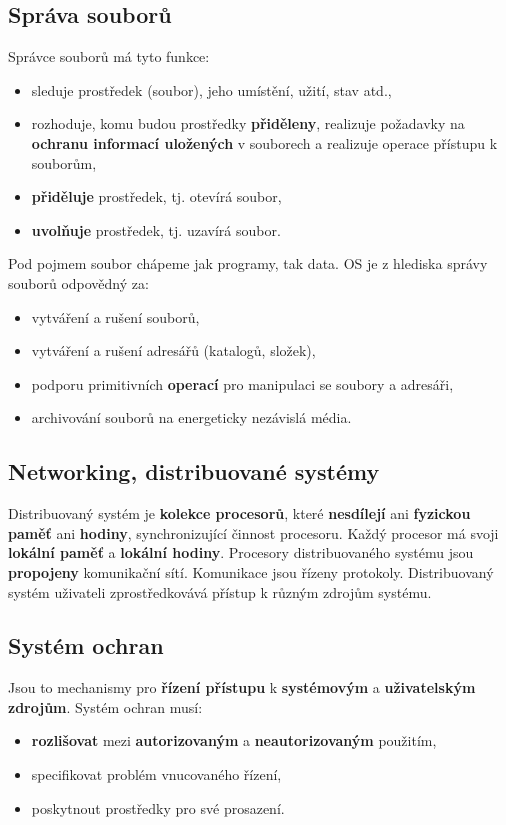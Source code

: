 \subsection{Správa souborů}
Správce souborů má tyto funkce:
\begin{itemize}
    \item sleduje prostředek (soubor), jeho umístění, užití, stav atd.,
    \item rozhoduje, komu budou prostředky \textbf{přiděleny}, realizuje požadavky na \textbf{ochranu informací uložených} v souborech a realizuje operace přístupu k souborům,
    \item \textbf{přiděluje} prostředek, tj. otevírá soubor,
    \item \textbf{uvolňuje} prostředek, tj. uzavírá soubor.
\end{itemize}
Pod pojmem soubor chápeme jak programy, tak data. OS je z hlediska správy souborů odpovědný za:
\begin{itemize}
    \item vytváření a rušení souborů,
    \item vytváření a rušení adresářů (katalogů, složek),
    \item podporu primitivních \textbf{operací} pro manipulaci se soubory a adresáři,
    \item archivování souborů na energeticky nezávislá média.
\end{itemize}
\subsection{Networking, distribuované systémy}
Distribuovaný systém je \textbf{kolekce procesorů}, které \textbf{nesdílejí} ani \textbf{fyzickou paměť} ani \textbf{hodiny}, synchronizující činnost procesoru. Každý procesor má svoji \textbf{lokální paměť} a \textbf{lokální hodiny}. Procesory distribuovaného systému jsou \textbf{propojeny} komunikační sítí. Komunikace jsou řízeny protokoly. Distribuovaný systém uživateli zprostředkovává přístup k různým zdrojům systému.

\subsection{Systém ochran}
Jsou to mechanismy pro \textbf{řízení přístupu} k \textbf{systémovým} a \textbf{uživatelským zdrojům}. Systém ochran musí:
\begin{itemize}
    \item \textbf{rozlišovat} mezi \textbf{autorizovaným} a \textbf{neautorizovaným} použitím,
    \item specifikovat problém vnucovaného řízení,
    \item poskytnout prostředky pro své prosazení.
\end{itemize}

